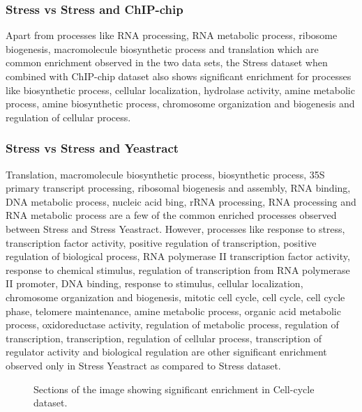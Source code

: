 \subsubsection{Stress vs Stress and ChIP-chip}

Apart from processes like RNA processing, RNA metabolic process, ribosome biogenesis, macromolecule biosynthetic process and translation which are common enrichment observed 
in the two data sets, the Stress dataset when combined with ChIP-chip dataset also shows significant enrichment for processes like biosynthetic process, cellular localization, 
hydrolase activity, amine metabolic process, amine biosynthetic process, chromosome organization and biogenesis and regulation of cellular process.

\subsubsection{Stress vs Stress and Yeastract}

Translation, macromolecule biosynthetic process, biosynthetic process, 35S primary transcript processing, ribosomal biogenesis and assembly, RNA binding, DNA metabolic process, 
nucleic acid bing, rRNA processing, RNA processing and RNA metabolic process are a few of the common enriched processes observed between Stress and Stress Yeastract. 
However, processes like response to stress, transcription factor activity, positive regulation of transcription, positive regulation of biological process, 
RNA polymerase II transcription factor activity, response to chemical stimulus, regulation of transcription from RNA polymerase II promoter, 
DNA binding, response to stimulus, cellular localization, chromosome organization and biogenesis, mitotic cell cycle, cell cycle, cell cycle phase, 
telomere maintenance, amine metabolic process, organic acid metabolic process, oxidoreductase activity, regulation of metabolic process, regulation of transcription, transcription, 
regulation of cellular process, transcription of regulator activity and biological regulation are other significant enrichment observed only 
in Stress Yeastract as compared to Stress dataset.

\begin{figure}[p]
\centering
{}
\caption{Sections of the image showing significant enrichment in Cell-cycle dataset. }
\label{fig:ccycle_only_enrich}
\end{figure}


